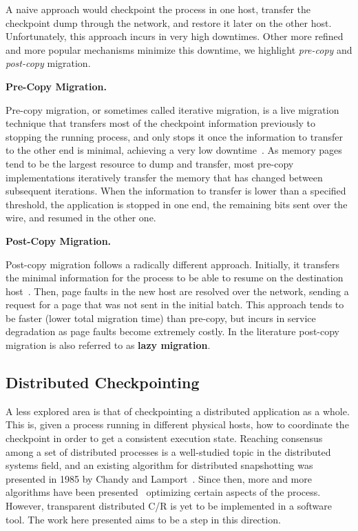 A naive approach would checkpoint the process in one host, transfer the checkpoint dump through the network, and restore it later on the other host.
Unfortunately, this approach incurs in very high downtimes.
Other more refined and more popular mechanisms minimize this downtime, we highlight \textit{pre-copy} and \textit{post-copy} migration.

\textbf{Pre-Copy Migration.}

Pre-copy migration, or sometimes called iterative migration, is a live migration technique that transfers most of the checkpoint information previously to stopping the running process, and only stops it once the information to transfer to the other end is minimal, achieving a very low downtime~\cite{Bradford2007}.
As memory pages tend to be the largest resource to dump and transfer, most pre-copy implementations iteratively transfer the memory that has changed between subsequent iterations. 
When the information to transfer is lower than a specified threshold, the application is stopped in one end, the remaining bits sent over the wire, and resumed in the other one.

\textbf{Post-Copy Migration.}

Post-copy migration follows a radically different approach.
Initially, it transfers the minimal information for the process to be able to resume on the destination host~\cite{Shirbam2012}.
Then, page faults in the new host are resolved over the network, sending a request for a page that was not sent in the initial batch.
This approach tends to be faster (lower total migration time) than pre-copy, but incurs in service degradation as page faults become extremely costly.
In the literature post-copy migration is also referred to as \textbf{lazy migration}.

\subsection{Distributed Checkpointing}

A less explored area is that of checkpointing a distributed application as a whole.
This is, given a process running in different physical hosts, how to coordinate the checkpoint in order to get a consistent execution state.
Reaching consensus among a set of distributed processes is a well-studied topic in the distributed systems field, and an existing algorithm for distributed snapshotting was presented in 1985 by Chandy and Lamport~\cite{Lamport1985}.
Since then, more and more algorithms have been presented~\cite{Raynal2013,Kshemkalyani2008} optimizing certain aspects of the process.
However, transparent distributed C/R is yet to be implemented in a software tool.
The work here presented aims to be a step in this direction.

